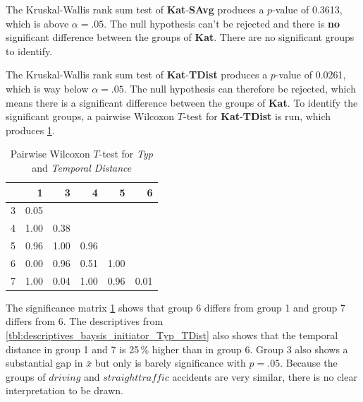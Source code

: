 The Kruskal-Wallis rank sum test of \textbf{Kat}-\textbf{SAvg} produces a $p$-value of 0.3613, which is above $\alpha=.05$. The null hypothesis can't be rejected and there is \textbf{no} significant difference between the groups of \textbf{Kat}. There are no significant groups to identify.

The Kruskal-Wallis rank sum test of \textbf{Kat}-\textbf{TDist} produces a $p$-value of 0.0261, which is way below $\alpha=.05$. The null hypothesis can therefore be rejected, which means there is a significant difference between the groups of \textbf{Kat}. To identify the significant groups, a pairwise Wilcoxon $T$-test for \textbf{Kat}-\textbf{TDist} is run, which produces \cref{tbl:wilcoxon_baysis_initiator_Typ_TDist}. 
\begin{table}[ht]
	\small
	\centering
    \begin{tabular}{rrrrrr}
        \toprule
        & 1 & 3 & 4 & 5 & 6 \\ 
        \midrule
        3 & 0.05 &  &  &  &  \\ 
        4 & 1.00 & 0.38 &  &  &  \\ 
        5 & 0.96 & 1.00 & 0.96 &  &  \\ 
        6 & 0.00 & 0.96 & 0.51 & 1.00 &  \\ 
        7 & 1.00 & 0.04 & 1.00 & 0.96 & 0.01 \\ 
        \bottomrule
    \end{tabular}
    \caption{Pairwise Wilcoxon $T$-test for \textit{Typ} and \textit{Temporal Distance}}
    \label{tbl:wilcoxon_baysis_initiator_Typ_TDist}
\end{table}
The significance matrix \cref{tbl:wilcoxon_baysis_initiator_Typ_TDist} shows that group 6 differs from group 1 and group 7 differs from 6. The descriptives from \cref{tbl:descriptives_baysis_initiator_Typ_TDist} also shows that the temporal distance in group 1 and 7 is 25\,\% higher than in group 6. Group 3 also shows a substantial gap in $\bar{x}$ but only is barely significance with $p=.05$. Because the groups of $driving$ and $straight traffic$ accidents are very similar, there is no clear interpretation to be drawn.

